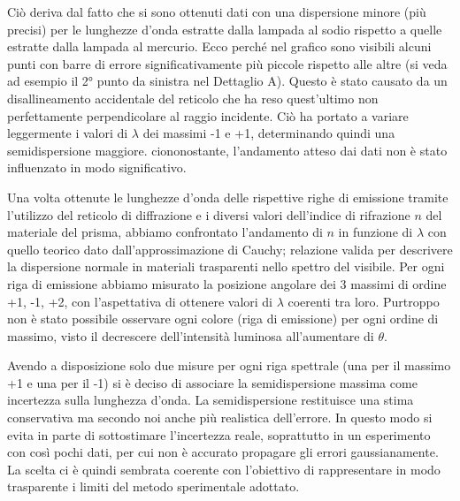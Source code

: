 \documentclass[9pt,a4paper,twocolumn,twoside]{tau-class/tau}
\begin{document}
Ciò deriva dal fatto che si sono ottenuti dati con una dispersione minore (più precisi) per le lunghezze d'onda estratte dalla lampada al sodio rispetto a quelle estratte dalla lampada al mercurio.  Ecco perché nel grafico sono visibili alcuni punti con barre di errore significativamente più piccole rispetto alle altre (si veda ad esempio il 2° punto da sinistra nel Dettaglio A). Questo è stato causato da un disallineamento accidentale del reticolo che ha reso quest'ultimo non perfettamente perpendicolare al raggio incidente. Ciò ha portato a variare leggermente i valori di \(\lambda\) dei massimi -1 e +1, determinando quindi una semidispersione maggiore. ciononostante, l'andamento atteso dai dati non è stato influenzato in modo significativo.



Una volta ottenute le lunghezze d'onda delle rispettive righe di emissione tramite l'utilizzo del reticolo di diffrazione e i diversi valori dell'indice di rifrazione \(n\) del materiale del prisma, abbiamo confrontato l'andamento di \(n\) in funzione di \(\lambda\) con quello teorico dato dall'approssimazione di Cauchy; relazione valida per descrivere la dispersione normale in materiali trasparenti nello spettro del visibile. Per ogni riga di emissione abbiamo misurato la posizione angolare dei 3 massimi di ordine +1, -1, +2, con l'aspettativa di ottenere valori di \(\lambda\) coerenti tra loro. Purtroppo non è stato possibile osservare ogni colore (riga di emissione) per ogni ordine di massimo, visto il decrescere dell'intensità luminosa all'aumentare di \(\theta\).

Avendo a disposizione solo due misure per ogni riga spettrale (una per il massimo +1 e una per il -1) si è deciso di associare la semidispersione massima come incertezza sulla lunghezza d'onda. La semidispersione restituisce una stima conservativa ma secondo noi anche più realistica dell’errore. In questo modo si evita in parte di sottostimare l’incertezza reale, soprattutto in un esperimento con così pochi dati, per cui non è accurato propagare gli errori gaussianamente. La scelta ci è quindi sembrata coerente con l’obiettivo di rappresentare in modo trasparente i limiti del metodo sperimentale adottato.
\end{document}
